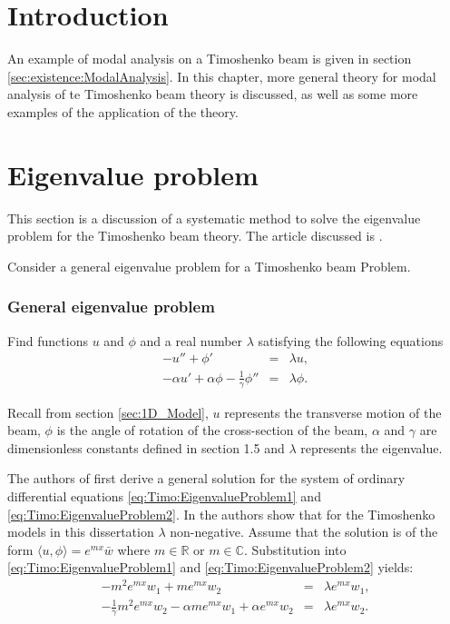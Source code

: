 \documentclass[../../main.tex]{subfiles}
\begin{document}
\section{Introduction}
An example of modal analysis on a Timoshenko beam is given in section \ref{sec:existence:ModalAnalysis}. In this chapter, more general theory for modal analysis of te Timoshenko beam theory is discussed, as well as some more examples of the application of the theory.

\section{Eigenvalue problem}\label{sec:Timo:EigenvalueProblem}
This section is a discussion of a systematic method to solve the eigenvalue problem for the Timoshenko beam theory. The article discussed is \cite{VV06}.

Consider a general eigenvalue problem for a Timoshenko beam Problem.
\subsubsection{General eigenvalue problem} \label{sssec:Timo:EigenvalueProblem}
Find functions $u$ and $\phi$ and a real number $\lambda$ satisfying the following equations
\begin{eqnarray}
-u'' + \phi' &=& \lambda u, \label{eq:Timo:EigenvalueProblem1}\\
-\alpha u' + \alpha\phi - \frac{1}{\gamma}\phi'' &=& \lambda\phi.\label{eq:Timo:EigenvalueProblem2}
\end{eqnarray}

Recall from section \ref{sec:1D_Model}, $u$ represents the transverse motion of the beam, $\phi$ is the angle of rotation of the cross-section of the beam, $\alpha$ and $\gamma$ are dimensionless constants defined in section 1.5 and $\lambda$ represents the eigenvalue. 

The authors of \cite{VV06} first derive a general solution for the system of ordinary differential equations \eqref{eq:Timo:EigenvalueProblem1} and \eqref{eq:Timo:EigenvalueProblem2}. In \cite{VV06} the authors show that for the Timoshenko models in this dissertation $\lambda$ non-negative. Assume that the solution is of the form $\langle u, \phi \rangle = e^{mx}\bar{w}$ where $m\in \mathbb{R}$ or $m\in \mathbb{C}$. Substitution into \eqref{eq:Timo:EigenvalueProblem1} and \eqref{eq:Timo:EigenvalueProblem2} yields:
\begin{eqnarray*}
-m^{2}e^{mx}w_{1}+me^{mx}w_{2}&=&\lambda e^{mx}w_{1},\\
-\frac{1}{\gamma}m^{2}e^{mx}w_{2}-\alpha me^{mx}w_{1}+\alpha e^{mx}w_{2}&=&\lambda e^{mx}w_{2}.
\end{eqnarray*}
\end{document}
